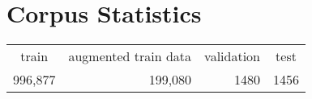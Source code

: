 \section{Corpus Statistics}
\begin{table}[]
\begin{tabular}{cccc}
train                       & augmented train data        & validation               & test                     \\
\multicolumn{1}{r}{996,877} & \multicolumn{1}{r}{199,080} & \multicolumn{1}{r}{1480} & \multicolumn{1}{r}{1456}
\end{tabular}
\end{table}
